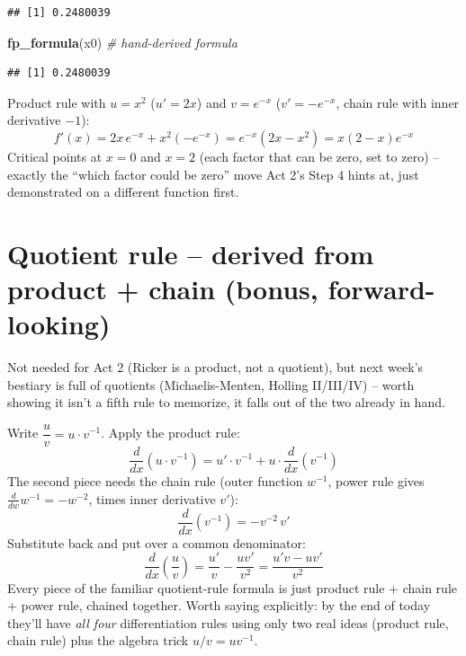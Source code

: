 \documentclass[12pt,]{article}
\newenvironment{Shaded}{\begin{snugshade}}{\end{snugshade}}
\newcommand{\KeywordTok}[1]{\textcolor[rgb]{0.13,0.29,0.53}{\textbf{{#1}}}}
\newcommand{\CommentTok}[1]{\textcolor[rgb]{0.56,0.35,0.01}{\textit{{#1}}}}
\newcommand{\NormalTok}[1]{{#1}}
\begin{document}
\begin{verbatim}
## [1] 0.2480039
\end{verbatim}

\begin{Shaded}
\begin{Highlighting}[]
\KeywordTok{fp_formula}\NormalTok{(x0)                          }\CommentTok{# hand-derived formula}
\end{Highlighting}
\end{Shaded}

\begin{verbatim}
## [1] 0.2480039
\end{verbatim}

Product rule with \(u=x^2\) (\(u'=2x\)) and \(v=e^{-x}\)
(\(v'=-e^{-x}\), chain rule with inner derivative \(-1\)):
\[f'(x) = 2x\,e^{-x} + x^2(-e^{-x}) = e^{-x}(2x-x^2) = x(2-x)e^{-x}\]
Critical points at \(x=0\) and \(x=2\) (each factor that can be zero,
set to zero) -- exactly the ``which factor could be zero'' move Act 2's
Step 4 hints at, just demonstrated on a different function first.

\section{Quotient rule -- derived from product + chain (bonus,
forward-looking)}\label{quotient-rule-derived-from-product-chain-bonus-forward-looking}

Not needed for Act 2 (Ricker is a product, not a quotient), but next
week's bestiary is full of quotients (Michaelis-Menten, Holling
II/III/IV) -- worth showing it isn't a fifth rule to memorize, it falls
out of the two already in hand.

Write \(\dfrac{u}{v} = u\cdot v^{-1}\). Apply the product rule:
\[\frac{d}{dx}\left(u\cdot v^{-1}\right) = u'\cdot v^{-1} + u\cdot\frac{d}{dx}\left(v^{-1}\right)\]
The second piece needs the chain rule (outer function \(w^{-1}\), power
rule gives \(\frac{d}{dw}w^{-1}=-w^{-2}\), times inner derivative
\(v'\)): \[\frac{d}{dx}\left(v^{-1}\right) = -v^{-2}\,v'\] Substitute
back and put over a common denominator:
\[\frac{d}{dx}\left(\frac{u}{v}\right) = \frac{u'}{v} - \frac{uv'}{v^2} = \frac{u'v - uv'}{v^2}\]
Every piece of the familiar quotient-rule formula is just product rule +
chain rule + power rule, chained together. Worth saying explicitly: by
the end of today they'll have \emph{all four} differentiation rules
using only two real ideas (product rule, chain rule) plus the algebra
trick \(u/v=uv^{-1}\).
\end{document}
